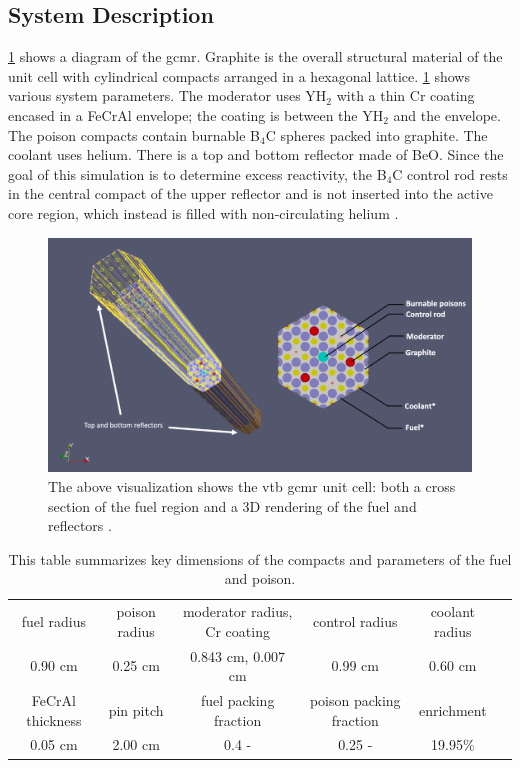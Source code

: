 \documentclass[letterpaper]{physor2024}
\begin{document}
\subsection{System Description}\label{sec:system}
 \cref{fig:vtb_gcmr} shows a diagram of the \gls{gcmr}. Graphite is the overall structural material of the unit cell with cylindrical compacts arranged in a hexagonal lattice. \cref{tab:dimensions} shows various system parameters. The moderator uses YH$_{2}$ with a thin Cr coating encased in a FeCrAl envelope; the coating is between the YH$_{2}$ and the envelope. The poison compacts contain burnable B$_{4}$C spheres packed into graphite. The coolant uses helium. There is a top and bottom reflector made of BeO. Since the goal of this simulation is to determine excess reactivity, the B$_{4}$C control rod rests in the central compact of the upper reflector and is not inserted into the active core region, which instead is filled with non-circulating helium \cite{Abdelhameed-ANS-2022}.
\begin{figure}[h!]
    \centering
    \includegraphics[width=0.725\linewidth]{figures/vtb_gcmr_diagram.jpg}
    \caption{The above visualization shows the \gls{vtb} \gls{gcmr} unit cell: both a cross section of the fuel region and a 3D rendering of the fuel and reflectors \cite{Stauff-applications-2022}.}
    \label{fig:vtb_gcmr}
\end{figure}
\vspace*{-0.6cm}
\begin{table}[h!]
    \centering
    \begin{tabular}{|c|c|c|c|c|c|}
    \hline
    fuel radius & poison radius & moderator radius, Cr coating & control radius & coolant radius \\
    0.90 cm & 0.25 cm   & 0.843 cm, 0.007 cm & 0.99 cm    & 0.60 cm  \\
    \hline
    FeCrAl thickness & pin pitch & fuel packing fraction & poison packing fraction & enrichment \\
    0.05 cm & 2.00 cm  & 0.4 -  & 0.25 - & 19.95\% \\
    \hline
    \end{tabular}
    \caption{This table summarizes key dimensions of the compacts and parameters of the fuel and poison.}
    \label{tab:dimensions}
\end{table}
\vspace*{-0.5cm}
\end{document}
